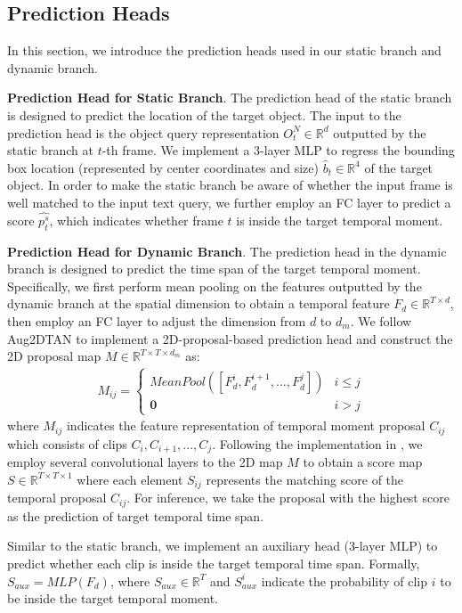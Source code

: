 \documentclass[sigconf]{acmart}
\begin{document}
\subsection{Prediction Heads}
In this section, we introduce the prediction heads used in our static branch and dynamic branch.

\noindent\textbf{Prediction Head for Static Branch}. The prediction head of the static branch is designed to predict the location of the target object. The input to the prediction head is the object query representation $O^{N}_t \in \mathbb{R}^{d}$ outputted by the static branch at $t$-th frame. We implement a 3-layer MLP to regress the bounding box location (represented by center coordinates and size) $\hat{b}_t \in \mathbb{R}^4$ of the target object. In order to make the static branch be aware of whether the input frame is well matched to the input text query, we further employ an FC layer to predict a score $\hat{p_t^{s}}$, which indicates whether frame $t$ is inside the target temporal moment.

\noindent\textbf{Prediction Head for Dynamic Branch}. The prediction head in the dynamic branch is designed to predict the time span of the target temporal moment. Specifically, we first perform mean pooling on the features outputted by the dynamic branch at the spatial dimension to obtain a temporal feature $F_d \in \mathbb{R}^{T\times d}$, then employ an FC layer to adjust the dimension from $d$ to $d_m$. We follow Aug2DTAN\cite{Aug2dTAN} to implement a 2D-proposal-based prediction head and construct the 2D proposal map $M\in \mathbb{R}^{T\times T\times d_m}$ as:
\begin{align}
  M_{ij} = \begin{cases} MeanPool\left(\left[F_d^{i}, F_d^{i+1},..., F_d^{j}\right]\right) & i \leq j \\
    \mathbf{0} & i > j
  \end{cases}
\end{align}
where $M_{ij}$ indicates the feature representation of temporal moment proposal $C_{ij}$ which consists of clips ${C_i, C_{i+1}, ..., C_{j}}$. Following the implementation in \cite{Aug2dTAN}, we employ several convolutional layers to the 2D map $M$ to obtain a score map $S \in \mathbb{R}^{T\times T\times 1}$ where each element $S_{ij}$ represents the matching score of the temporal proposal $C_{ij}$. For inference, we take the proposal with the highest score as the prediction of target temporal time span.

Similar to the static branch, we implement an auxiliary head (3-layer MLP) to predict whether each clip is inside the target temporal time span. Formally, $S_{aux} = MLP(F_d)$, where $S_{aux} \in \mathbb{R}^{T}$ and $S_{aux}^{i}$ indicate the probability of clip $i$ to be inside the target temporal moment.
\end{document}
